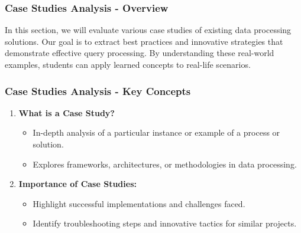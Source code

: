 \documentclass[aspectratio=169]{beamer}
\begin{document}
\begin{frame}[fragile]
    \frametitle{Case Studies Analysis - Overview}
    In this section, we will evaluate various case studies of existing data processing solutions. 
    Our goal is to extract best practices and innovative strategies that demonstrate effective query processing. 
    By understanding these real-world examples, students can apply learned concepts to real-life scenarios.
\end{frame}

\begin{frame}[fragile]
    \frametitle{Case Studies Analysis - Key Concepts}
    \begin{enumerate}
        \item \textbf{What is a Case Study?}
        \begin{itemize}
            \item In-depth analysis of a particular instance or example of a process or solution.
            \item Explores frameworks, architectures, or methodologies in data processing.
        \end{itemize}
        
        \item \textbf{Importance of Case Studies:}
        \begin{itemize}
            \item Highlight successful implementations and challenges faced.
            \item Identify troubleshooting steps and innovative tactics for similar projects.
        \end{itemize}
    \end{enumerate}
\end{frame}
\end{document}
